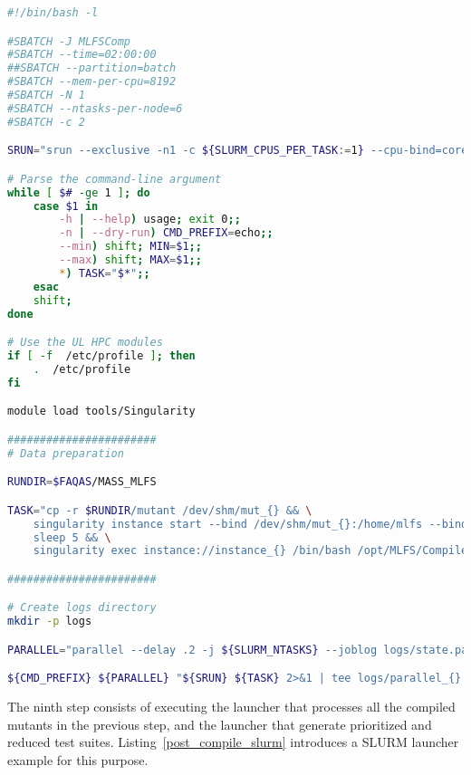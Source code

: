 \begin{lstlisting}[language=bash, label=compile_slurm ,caption=Example of the SLURM launcher for CompileOptimizedMutants step.]
#!/bin/bash -l

#SBATCH -J MLFSComp
#SBATCH --time=02:00:00
##SBATCH --partition=batch
#SBATCH --mem-per-cpu=8192
#SBATCH -N 1
#SBATCH --ntasks-per-node=6
#SBATCH -c 2

SRUN="srun --exclusive -n1 -c ${SLURM_CPUS_PER_TASK:=1} --cpu-bind=cores"

# Parse the command-line argument
while [ $# -ge 1 ]; do
    case $1 in
        -h | --help) usage; exit 0;;
        -n | --dry-run) CMD_PREFIX=echo;;
        --min) shift; MIN=$1;;
        --max) shift; MAX=$1;;
        *) TASK="$*";;
    esac
    shift;
done

# Use the UL HPC modules
if [ -f  /etc/profile ]; then
    .  /etc/profile
fi

module load tools/Singularity

#######################
# Data preparation

RUNDIR=$FAQAS/MASS_MLFS

TASK="cp -r $RUNDIR/mutant /dev/shm/mut_{} && \
    singularity instance start --bind /dev/shm/mut_{}:/home/mlfs --bind $RUNDIR/MASS_WORKSPACE:/opt/MLFS --bind $FAQAS/srcirorfaqas:/opt/srcirorfaqas $RUNDIR/blts.sif instance_{} \
    sleep 5 && \
    singularity exec instance://instance_{} /bin/bash /opt/MLFS/CompileOptimizedMutants.sh {}"

#######################

# Create logs directory
mkdir -p logs

PARALLEL="parallel --delay .2 -j ${SLURM_NTASKS} --joblog logs/state.parallel.log --resume"

${CMD_PREFIX} ${PARALLEL} "${SRUN} ${TASK} 2>&1 | tee logs/parallel_{}.log && ${SRUN} singularity instance stop instance_{}" ::: $(seq ${MIN} ${MAX})
\end{lstlisting}


The ninth step consists of executing the launcher that processes all the compiled mutants in the previous step, and the launcher that generate prioritized and reduced test suites. Listing~\ref{post_compile_slurm} introduces a SLURM launcher example for this purpose.

